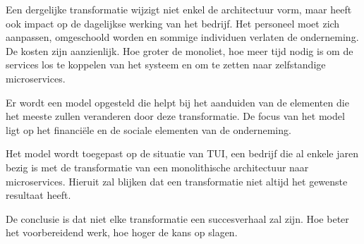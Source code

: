 Een dergelijke transformatie wijzigt niet enkel de architectuur vorm, maar heeft ook impact op de dagelijkse werking van het bedrijf. Het personeel moet zich aanpassen, omgeschoold worden en sommige individuen verlaten de onderneming. De kosten zijn aanzienlijk. Hoe groter de monoliet, hoe meer tijd nodig is om de services los te koppelen van het systeem en om te zetten naar zelfstandige microservices. 

Er wordt een model opgesteld die helpt bij het aanduiden van de elementen die het meeste zullen veranderen door deze transformatie. De focus van het model ligt op het financiële en de sociale elementen van de onderneming.

Het model wordt toegepast op de situatie van TUI, een bedrijf die al enkele jaren bezig is met de transformatie van een monolithische architectuur naar microservices. Hieruit zal blijken dat een transformatie niet altijd het gewenste resultaat heeft. 

De conclusie is dat niet elke transformatie een succesverhaal zal zijn. Hoe beter het voorbereidend werk, hoe hoger de kans op slagen.

